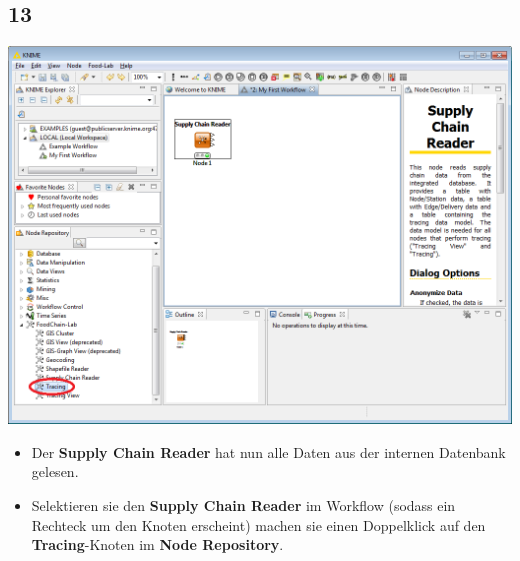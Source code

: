 \documentclass{beamer}
\begin{document}
\subsection{13}
\begin{frame}
	\begin{center}
  		\includegraphics[height=0.6\textheight]{13.png}
	\end{center}
	\begin{itemize}
		\item Der \textbf{Supply Chain Reader} hat nun alle Daten aus der internen Datenbank gelesen.
		\item Selektieren sie den \textbf{Supply Chain Reader} im Workflow (sodass ein Rechteck um den Knoten erscheint) machen sie einen Doppelklick auf den \textbf{Tracing}-Knoten im \textbf{Node Repository}.
	\end{itemize}
\end{frame}
\end{document}

